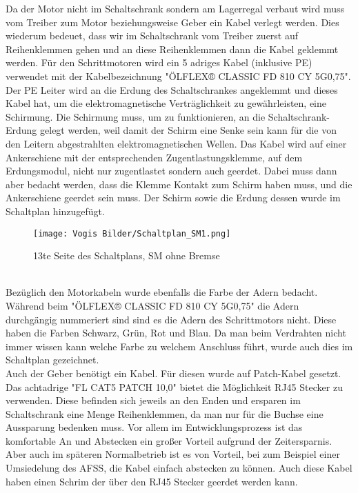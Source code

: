     Da der Motor nicht im Schaltschrank sondern am Lagerregal verbaut wird muss vom Treiber zum Motor beziehungsweise Geber ein Kabel verlegt werden. Dies wiederum bedeuet, dass wir im Schaltschrank vom Treiber zuerst auf Reihenklemmen gehen und an diese Reihenklemmen dann die Kabel geklemmt werden. Für den Schrittmotoren wird ein 5 adriges Kabel (inklusive PE) verwendet mit der Kabelbezeichnung "ÖLFLEX® CLASSIC FD 810 CY 5G0,75". Der PE Leiter wird an die Erdung des Schaltschrankes angeklemmt und dieses Kabel hat, um die elektromagnetische Verträglichkeit zu gewährleisten, eine Schirmung. Die Schirmung muss, um zu funktionieren, an die Schaltschrank-Erdung gelegt werden, weil damit der Schirm eine Senke sein kann für die von den Leitern abgestrahlten elektromagnetischen Wellen. Das Kabel wird auf einer Ankerschiene mit der entsprechenden Zugentlastungsklemme, auf dem Erdungsmodul, nicht nur zugentlastet sondern auch geerdet. Dabei muss dann aber bedacht werden, dass die Klemme Kontakt zum Schirm haben muss, und die Ankerschiene geerdet sein muss. Der Schirm sowie die Erdung dessen wurde im Schaltplan hinzugefügt.    
    \begin{figure}[h]
        \centering
        \texttt{[image: Vogis Bilder/Schaltplan\_SM1.png]}
        \caption{13te Seite des Schaltplans, SM ohne Bremse}
        \label{fig:SMohneBremse}
    \end{figure}
    \\Bezüglich den Motorkabeln wurde ebenfalls die Farbe der Adern bedacht. Während beim "ÖLFLEX® CLASSIC FD 810 CY 5G0,75" die Adern durchgängig nummeriert sind sind es die Adern des Schrittmotors nicht. Diese haben die Farben Schwarz, Grün, Rot und Blau. Da man beim Verdrahten nicht immer wissen kann welche Farbe zu welchem Anschluss führt, wurde auch dies im Schaltplan gezeichnet.\cite{Nema_SM_Kontaktbezeichnung}\\
    Auch der Geber benötigt ein Kabel. Für diesen wurde auf Patch-Kabel gesetzt. Das achtadrige "FL CAT5 PATCH 10,0" bietet die Möglichkeit RJ45 Stecker zu verwenden. Diese befinden sich jeweils an den Enden und ersparen im Schaltschrank eine Menge Reihenklemmen, da man nur für die Buchse eine Aussparung bedenken muss. Vor allem im Entwicklungsprozess ist das komfortable An und Abstecken ein großer Vorteil aufgrund der Zeitersparnis. Aber auch im späteren Normalbetrieb ist es von Vorteil, bei zum Beispiel einer Umsiedelung des AFSS, die Kabel einfach abstecken zu können. Auch diese Kabel haben einen Schrim der über den RJ45 Stecker geerdet werden kann.\\
